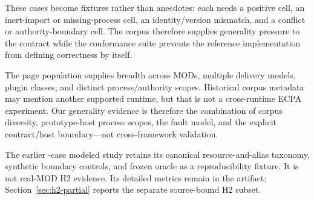 \documentclass[letterpaper,twocolumn,10pt]{article}
\begin{document}
These cases become fixtures rather than anecdotes: each needs a positive cell,
an inert-import or missing-process cell, an identity/version mismatch, and a
conflict or authority-boundary cell.  The corpus therefore supplies generality
pressure to the contract while the conformance suite prevents the reference
implementation from defining correctness by itself.

The page population supplies breadth across \ECPAWorkshopMods{} MODs, multiple
delivery models, plugin classes, and distinct process/authority scopes.
Historical corpus metadata may mention another supported runtime, but that is
not a cross-runtime ECPA experiment.  Our generality evidence is therefore the
combination of corpus diversity, prototype-host process scopes, the fault model, and
the explicit contract/host boundary---not cross-framework validation.

The earlier \ECPAPlannerCases{}-case modeled study retains its canonical
resource-and-alias taxonomy, synthetic boundary controls, and frozen oracle
as a reproducibility fixture. It is not real-MOD H2 evidence. Its detailed
metrics remain in the artifact; Section~\ref{sec:h2-partial} reports the
separate source-bound H2 subset.
\end{document}

